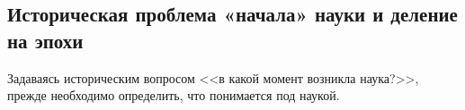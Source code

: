 




\subsection{Историческая проблема «начала» науки и деление на эпохи}

Задаваясь историческим вопросом <<в какой момент возникла наука?>>, прежде
необходимо определить, что понимается под наукой.



